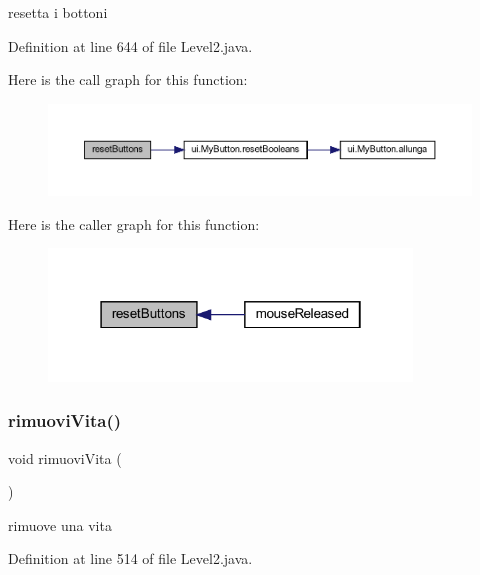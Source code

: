 resetta i bottoni 



Definition at line 644 of file Level2.\+java.

Here is the call graph for this function\+:\nopagebreak
\begin{figure}[H]
\begin{center}
\leavevmode
\includegraphics[width=350pt]{classscenes_1_1_level2_a548cf4795e9d559d0c0cce0bb57a5251_cgraph}
\end{center}
\end{figure}
Here is the caller graph for this function\+:\nopagebreak
\begin{figure}[H]
\begin{center}
\leavevmode
\includegraphics[width=274pt]{classscenes_1_1_level2_a548cf4795e9d559d0c0cce0bb57a5251_icgraph}
\end{center}
\end{figure}
\mbox{\label{classscenes_1_1_level2_a484775c889ccd8602b66ad795b141534}} 
\subsubsection{\texorpdfstring{rimuovi\+Vita()}{rimuoviVita()}}
{\footnotesize\ttfamily void rimuovi\+Vita (\begin{DoxyParamCaption}{ }\end{DoxyParamCaption})}



rimuove una vita 



Definition at line 514 of file Level2.\+java.


